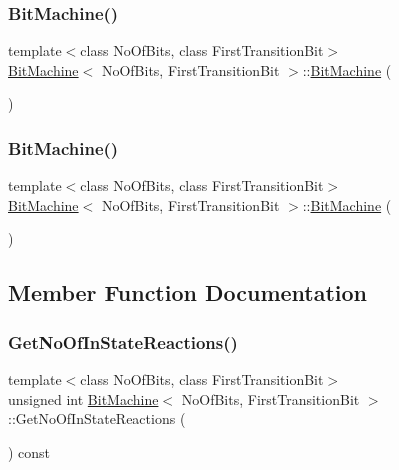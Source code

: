 \subsubsection{\texorpdfstring{Bit\+Machine()}{BitMachine()}\hspace{0.1cm}{\footnotesize\ttfamily [1/2]}}
{\footnotesize\ttfamily template$<$class No\+Of\+Bits, class First\+Transition\+Bit$>$ \\
\mbox{\hyperlink{struct_bit_machine}{Bit\+Machine}}$<$ No\+Of\+Bits, First\+Transition\+Bit $>$\+::\mbox{\hyperlink{struct_bit_machine}{Bit\+Machine}} (\begin{DoxyParamCaption}{ }\end{DoxyParamCaption})\hspace{0.3cm}{\ttfamily [inline]}}

\mbox{\label{struct_bit_machine_a58f14b49b03c4763e3c4b8737ba285fe}} 
\subsubsection{\texorpdfstring{Bit\+Machine()}{BitMachine()}\hspace{0.1cm}{\footnotesize\ttfamily [2/2]}}
{\footnotesize\ttfamily template$<$class No\+Of\+Bits, class First\+Transition\+Bit$>$ \\
\mbox{\hyperlink{struct_bit_machine}{Bit\+Machine}}$<$ No\+Of\+Bits, First\+Transition\+Bit $>$\+::\mbox{\hyperlink{struct_bit_machine}{Bit\+Machine}} (\begin{DoxyParamCaption}{ }\end{DoxyParamCaption})\hspace{0.3cm}{\ttfamily [inline]}}



\subsection{Member Function Documentation}
\mbox{\label{struct_bit_machine_a7e488a02bcdc1984dd078aff1db33ce1}} 
\subsubsection{\texorpdfstring{Get\+No\+Of\+In\+State\+Reactions()}{GetNoOfInStateReactions()}}
{\footnotesize\ttfamily template$<$class No\+Of\+Bits, class First\+Transition\+Bit$>$ \\
unsigned int \mbox{\hyperlink{struct_bit_machine}{Bit\+Machine}}$<$ No\+Of\+Bits, First\+Transition\+Bit $>$\+::Get\+No\+Of\+In\+State\+Reactions (\begin{DoxyParamCaption}{ }\end{DoxyParamCaption}) const\hspace{0.3cm}{\ttfamily [inline]}}

